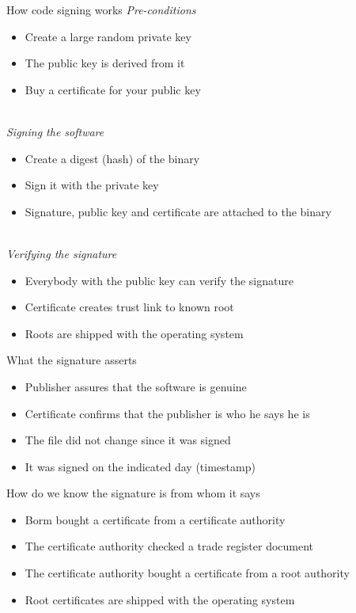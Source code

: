 \documentclass[11pt]{beamer}
\begin{document}
\begin{frame}{How code signing works}
\emph{Pre-conditions}
\begin{itemize}
\item Create a large random private key
\item The public key is derived from it
\item Buy a certificate for your public key
\end{itemize}
\pause
\\[0.2cm]
\emph{Signing the software}
\begin{itemize}
\item Create a digest (hash) of the binary
\item Sign it with the private key
\item Signature, public key and certificate are attached to the binary
\end{itemize}
\pause
\\[0.2cm]
\emph{Verifying the signature}
\begin{itemize}
\item Everybody with the public key can verify the signature
\item Certificate creates trust link to known root
\item Roots are shipped with the operating system
\end{itemize}
\end{frame}

\begin{frame}{What the signature asserts}
\begin{itemize}
\item Publisher assures that the software is genuine
\item Certificate confirms that the publisher is who he says he is
\item The file did not change since it was signed
\item It was signed on the indicated day (timestamp)
\end{itemize}
\end{frame}

\begin{frame}{How do we know the signature is from whom it says}
\begin{itemize}
\item Borm bought a certificate from a certificate authority
\item The certificate authority checked a trade register document
\item The certificate authority bought a certificate from a root authority
\item Root certificates are shipped with the operating system
\end{itemize}
\end{frame}
\end{document}
